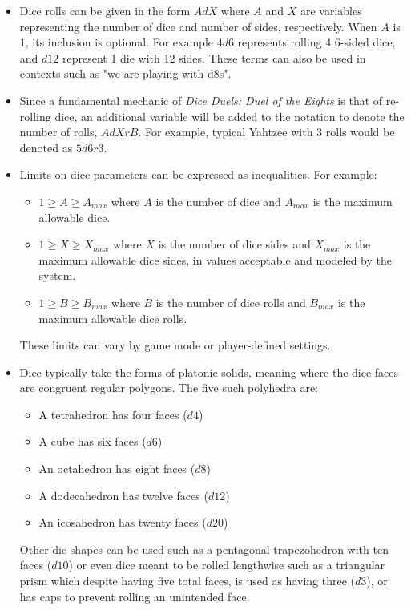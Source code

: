 \begin{itemize}

\item Dice rolls can be given in the form $AdX$ where $A$ and $X$ are variables representing the number of dice and number of sides, respectively. When $A$ is $1$, its inclusion is optional. For example $4d6$ represents rolling 4 6-sided dice, and $d12$ represent 1 die with 12 sides. These terms can also be used in contexts such as "we are playing with d8s".

\item Since a fundamental mechanic of \textit{Dice Duels: Duel of the Eights} is that of re-rolling dice, an additional variable will be added to the notation to denote the number of rolls, $AdXrB$. For example, typical Yahtzee with 3 rolls would be denoted as $5d6r3$.

\item Limits on dice parameters can be expressed as inequalities. For example:
\begin{itemize}
	\item $1 \geq A \geq A_{max}$ where $A$ is the number of dice and $A_{max}$ is the maximum allowable dice.
	\item $1 \geq X \geq X_{max}$ where $X$ is the number of dice sides and $X_{max}$ is the maximum allowable dice sides, in values acceptable and modeled by the system.
	\item $1 \geq B \geq B_{max}$ where $B$ is the number of dice rolls and $B_{max}$ is the maximum allowable dice rolls.
\end{itemize}
These limits can vary by game mode or player-defined settings.

\item Dice typically take the forms of platonic solids, meaning where the dice faces are congruent regular polygons. The five such polyhedra are:
\begin{itemize}
	\item A tetrahedron has four faces ($d4$)
	\item A cube has six faces ($d6$)
	\item An octahedron has eight faces ($d8$)
	\item A dodecahedron has twelve faces ($d12$)
	\item An icosahedron has twenty faces ($d20$)
\end{itemize}
Other die shapes can be used such as a pentagonal trapezohedron with ten faces ($d10$) or even dice meant to be rolled lengthwise such as a triangular prism which despite having five total faces, is used as having three ($d3$), or has caps to prevent rolling an unintended face.


\end{itemize}
